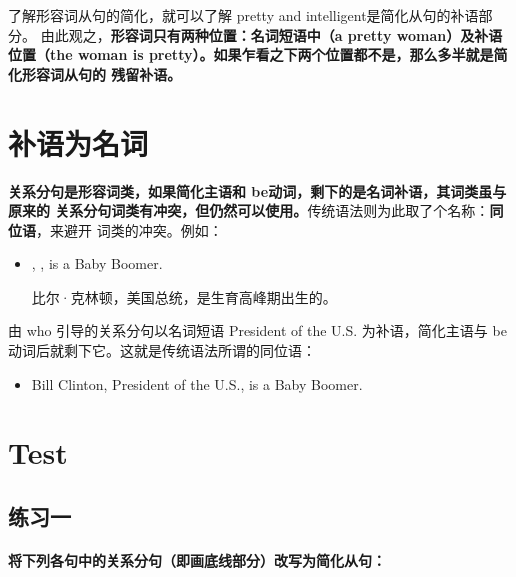 了解形容词从句的简化，就可以了解 pretty and intelligent是简化从句的补语部分。
由此观之，\textbf{形容词只有两种位置：名词短语中（a pretty woman）及补语位置（the
  woman is pretty）。如果乍看之下两个位置都不是，那么多半就是简化形容词从句的
  残留补语。}

\section{补语为名词}

\textbf{关系分句是形容词类，如果简化主语和 be动词，剩下的是名词补语，其词类虽与原来的
关系分句词类有冲突，但仍然可以使用。}传统语法则为此取了个名称：\textbf{同位语}，来避开
词类的冲突。例如：
\begin{itemize}
\item {}, ,
  is a Baby Boomer.

  比尔·克林顿，美国总统，是生育高峰期出生的。
\end{itemize}
由 who 引导的关系分句以名词短语 President of the U.S. 为补语，简化主语与
be 动词后就剩下它。这就是传统语法所谓的同位语：
\begin{itemize}
\item Bill Clinton, President of the U.S., is a Baby Boomer.
\end{itemize}

\section{Test}

\subsection{练习一}

\paragraph{将下列各句中的关系分句（即画底线部分）改写为简化从句：}

